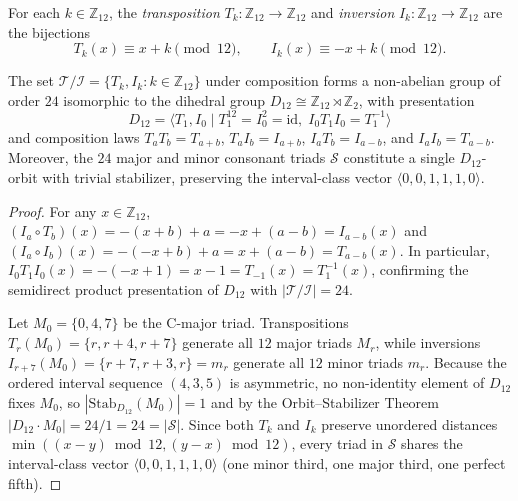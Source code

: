\begin{definition}
For each $k \in \mathbb{Z}_{12}$, the \emph{transposition} $T_k : \mathbb{Z}_{12} \to \mathbb{Z}_{12}$ and \emph{inversion} $I_k : \mathbb{Z}_{12} \to \mathbb{Z}_{12}$ are the bijections
\begin{equation}
T_k(x) \equiv x + k \pmod{12}, \qquad I_k(x) \equiv -x + k \pmod{12}.
\end{equation}
\end{definition}

\begin{theorem}
\label{thm:dihedral}
The set $\mathcal{T}/\mathcal{I} = \{T_k, I_k : k \in \mathbb{Z}_{12}\}$ under composition forms a non-abelian group of order $24$ isomorphic to the dihedral group $D_{12} \cong \mathbb{Z}_{12} \rtimes \mathbb{Z}_2$, with presentation
\[
D_{12} = \langle T_1, I_0 \mid T_1^{12} = I_0^2 = \mathrm{id},\; I_0 T_1 I_0 = T_1^{-1} \rangle
\]
and composition laws $T_a T_b = T_{a+b}$, $T_a I_b = I_{a+b}$, $I_a T_b = I_{a-b}$, and $I_a I_b = T_{a-b}$. Moreover, the $24$ major and minor consonant triads $\mathcal{S}$ constitute a single $D_{12}$-orbit with trivial stabilizer, preserving the interval-class vector $\langle 0, 0, 1, 1, 1, 0 \rangle$.
\end{theorem}

\begin{proof}
For any $x \in \mathbb{Z}_{12}$, $(I_a \circ T_b)(x) = -(x + b) + a = -x + (a - b) = I_{a-b}(x)$ and $(I_a \circ I_b)(x) = -(-x + b) + a = x + (a - b) = T_{a-b}(x)$. In particular, $I_0 T_1 I_0(x) = -( -x + 1 ) = x - 1 = T_{-1}(x) = T_1^{-1}(x)$, confirming the semidirect product presentation of $D_{12}$ with $|\mathcal{T}/\mathcal{I}| = 24$.

Let $M_0 = \{0, 4, 7\}$ be the C-major triad. Transpositions $T_r(M_0) = \{r, r+4, r+7\}$ generate all $12$ major triads $M_r$, while inversions $I_{r+7}(M_0) = \{r+7, r+3, r\} = m_r$ generate all $12$ minor triads $m_r$. Because the ordered interval sequence $(4, 3, 5)$ is asymmetric, no non-identity element of $D_{12}$ fixes $M_0$, so $|\mathrm{Stab}_{D_{12}}(M_0)| = 1$ and by the Orbit--Stabilizer Theorem $|D_{12} \cdot M_0| = 24 / 1 = 24 = |\mathcal{S}|$. Since both $T_k$ and $I_k$ preserve unordered distances $\min((x-y)\bmod 12, (y-x)\bmod 12)$, every triad in $\mathcal{S}$ shares the interval-class vector $\langle 0, 0, 1, 1, 1, 0 \rangle$ (one minor third, one major third, one perfect fifth).
\end{proof}

